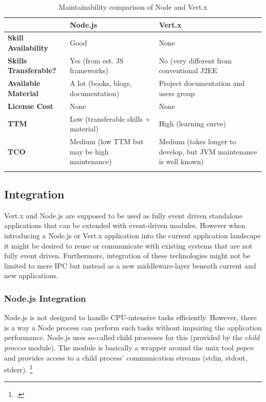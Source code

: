 \begin{savenotes}
\begin{longtable}[c]{p{} p{} p{}}
\toprule
				& \textbf{Node.js} & \textbf{Vert.x} \\
\midrule 
\endhead
\textbf{Skill Availability}		& Good			& None%
\\							  
\textbf{Skills Transferable?}	& Yes (from est. JS frameworks)	& No (very different from conventional J2EE\nomenclature{J2EE}{Java 2 Enterprise  Edition}
\\
\textbf{Available Material}		& A lot (books, blogs, documentation) & Project documentation and users group
\\
\textbf{License Cost}			& None 			& None
 \\
 \textbf{TTM} 					& Low (transferable skills + material) & High (learning curve)
 \\
 \textbf{TCO}					& Medium (low TTM but may be high maintenance) & Medium (takes longer to develop, but JVM maintenance is well known)
 \\
\bottomrule 
  \caption{Maintainability comparison of Node and Vert.x}
  \label{tbl_maintain}
\end{longtable}
\end{savenotes}

\subsection{Integration}
\label{integration}
Vert.x and Node.js are supposed to be used as fully event driven standalone
applications that can be extended with event-driven modules.
However when introducing a Node.js or Vert.x application into the current
application landscape it might be desired to reuse or communicate with existing
systems that are not fully event driven. Furthermore, integration of these technologies might not be limited to mere IPC but instead as a new middleware-layer beneath current and new applications.\\

\subsubsection{Node.js Integration}
\label{node_integration}
Node.js is not designed to handle CPU-intensive tasks efficiently. However,
there is a way a Node process can perform such tasks without impairing the
application performance. Node.js uses so-called child processes for this
(provided by the \textit{child process}
module). The module is basically a wrapper around the unix tool \textit{popen} and
provides access to a child process' communication streams (stdin, stdout, stderr).
\footcite[Cf.][]{node_child_process}

